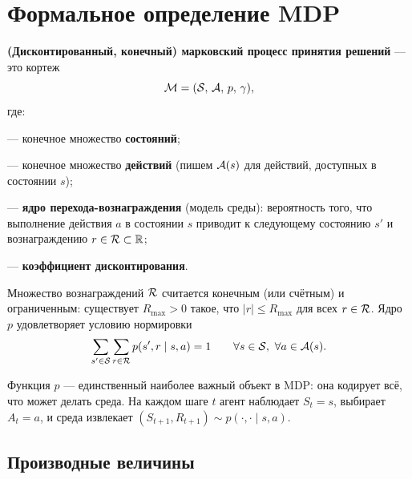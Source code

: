 \section{Формальное определение MDP}
\label{sec:mdp-definition}

\begin{definition}
\label{def:mdp}
\textbf{(Дисконтированный, конечный) марковский процесс принятия решений} — это кортеж
\begin{equation}
\label{eq:mdp-tuple}
\mathcal{M} = (\mathcal{S},\, \mathcal{A},\, p,\, \gamma),
\end{equation}
где:
\begin{description}[
    style=unboxed,
    leftmargin=0pt,
    labelindent=0pt,
    labelsep=0.4em,
    itemsep=2pt,
    topsep=4pt,
    parsep=0pt,
    font=\normalfont
  ]
  \item[$\cS$] — конечное множество \textbf{состояний};
  \item[$\cA$] — конечное множество \textbf{действий} (пишем $\mathcal{A}(s)$ для действий, доступных в состоянии $s$);
  \item[$p(s',r \mid s, a)$] — \textbf{ядро перехода-вознаграждения} (модель среды): вероятность того, что выполнение действия $a$ в состоянии $s$ приводит к следующему состоянию $s'$ и вознаграждению $r \in \mathcal{R} \subset \mathbb{R}$;
  \item[$\gamma \in [0, 1)$] — \textbf{коэффициент дисконтирования}.
\end{description}
Множество вознаграждений $\mathcal{R}$ считается конечным (или счётным) и ограниченным: существует $R_{\max} > 0$ такое, что $|r| \le R_{\max}$ для всех $r \in \mathcal{R}$. Ядро $p$ удовлетворяет условию нормировки
\begin{equation}
\label{eq:normalisation}
\sum_{s' \in \mathcal{S}} \sum_{r \in \mathcal{R}} p(s', r \mid s, a) = 1
\qquad \forall s \in \mathcal{S},\ \forall a \in \mathcal{A}(s).
\end{equation}
\end{definition}

Функция $p$ — единственный наиболее важный объект в MDP: она кодирует всё, что может делать среда. На каждом шаге $t$ агент наблюдает $S_t = s$, выбирает $A_t = a$, и среда извлекает $(S_{t+1}, R_{t+1}) \sim p(\cdot, \cdot \mid s, a)$.

\subsection*{Производные величины}

